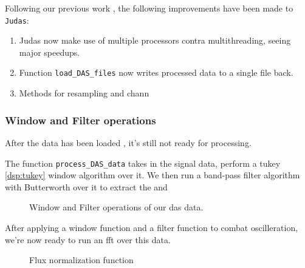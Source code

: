 Following our previous work \cite{projthesis}, the following improvements have been made to \texttt{Judas}: 

\begin{enumerate}
    \item Judas now make use of multiple processors contra multithreading, seeing major speedups.
    \item Function \texttt{load\_DAS\_files} now writes processed data to a single file back.
    \item Methods for resampling and chann
\end{enumerate}


\subsubsection{Window and Filter operations}

After the data has been loaded \cite{projthesis}, it's still not ready for processing. 

The function \lstinline|process_DAS_data| takes in the signal data, perform a tukey \ref{dsp:tukey} window algorithm over it. We then run a band-pass filter algorithm with Butterworth over it to extract the and 

\begin{figure}[h]
    \centering
    
    \caption{Window and Filter operations of our \acrshort{das} data.}
    \label{fig:procdasdata}
\end{figure}


After applying a window function and a filter function to combat oscilleration, we're now ready to run an fft over this data. 





\begin{figure}[h]
    \centering
    
    \caption{Flux normalization function}
    \label{fig:judas_usage}
\end{figure}
